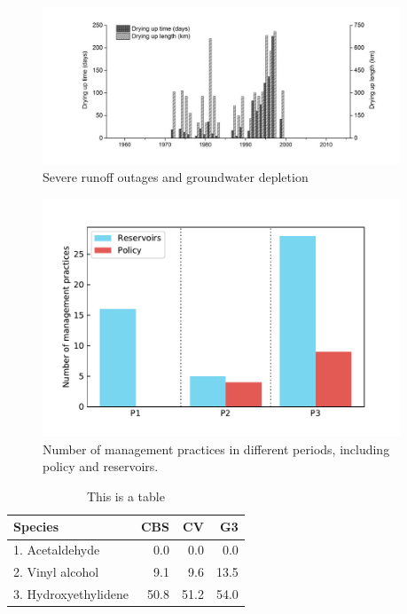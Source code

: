 \documentclass[9pt,twoside,lineno]{pnas-new}
\begin{document}
\begin{figure}
    \centering
    \includegraphics[width=0.95\textwidth]{../../figures/supplementary_information/outages.jpg}
    \caption{Severe runoff outages and groundwater depletion}
\end{figure}

\begin{figure}
    \centering
    \includegraphics[width=0.95\textwidth]{../../figures/supplementary_information/managements.pdf}
    \caption{Number of management practices in different periods, including policy and reservoirs.}
\end{figure}



\begin{table}\centering
\caption{This is a table}

\begin{tabular}{lrrr}
Species & CBS & CV & G3 \\
\midrule
1. Acetaldehyde & 0.0 & 0.0 & 0.0 \\
2. Vinyl alcohol & 9.1 & 9.6 & 13.5 \\
3. Hydroxyethylidene & 50.8 & 51.2 & 54.0\\
\bottomrule
\end{tabular}
\end{table}




\FloatBarrier




\end{document}
